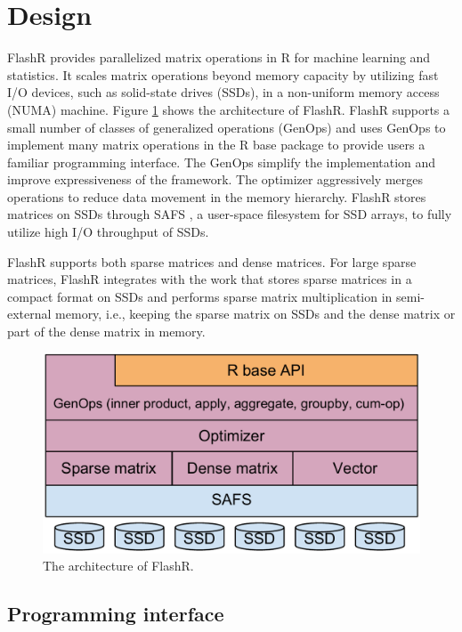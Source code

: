 \section{Design}

FlashR provides parallelized matrix operations in R for machine learning and
statistics. It scales matrix operations beyond memory capacity by utilizing
fast I/O devices, such as solid-state drives (SSDs), in a non-uniform memory
access (NUMA) machine. Figure \ref{fig:arch} shows the architecture of FlashR.
FlashR supports a small number of classes of generalized operations (GenOps)
and uses GenOps to implement many matrix operations in the R base package
to provide users a familiar programming interface. The GenOps simplify
the implementation and improve expressiveness of the framework. The optimizer
aggressively merges operations to reduce data movement in the memory hierarchy.
FlashR stores matrices on SSDs through SAFS \cite{safs}, a user-space filesystem
for SSD arrays, to fully utilize high I/O throughput of SSDs.

FlashR supports both sparse matrices and dense matrices. For large sparse matrices,
FlashR integrates with the work \cite{SEM_SpMM} that stores sparse matrices
in a compact format on SSDs and performs sparse matrix multiplication
in semi-external memory, i.e., keeping the sparse matrix on SSDs and
the dense matrix or part of the dense matrix in memory.

\begin{figure}
\centering
\includegraphics[scale=0.3]{FlashMatrix_figs/architecture.pdf}
\vspace{-5pt}
\caption{The architecture of FlashR.}
\label{fig:arch}
\vspace{-10pt}
\end{figure}

\subsection{Programming interface} \label{sec:api}

